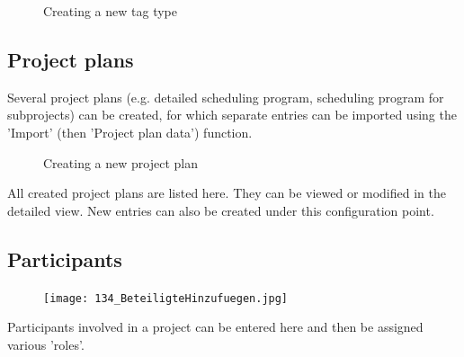 \begin{figure}[H]
\caption{Creating a new tag type}
\end{figure}\pagebreak

\subsection{Project plans}

Several project plans (e.g. detailed scheduling program, scheduling program for subprojects) can be created, for which separate entries can be imported using the 'Import' (then 'Project plan data') function.

\begin{figure}[H]
\caption{Creating a new project plan}
\end{figure}

All created project plans are listed here. They can be viewed or modified in the detailed view. New entries can also be created under this configuration point.

\subsection{Participants}

\begin{figure}
\vspace{-25pt}
\texttt{[image: 134\_BeteiligteHinzufuegen.jpg]}
\end{figure}

Participants involved in a project can be entered here and then be assigned various 'roles'.


